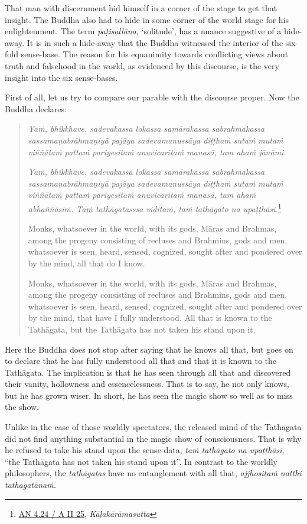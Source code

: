 That man with discernment hid himself in a corner of the stage to get that insight. The Buddha also had to hide in some corner of the world stage for his enlightenment. The term \emph{paṭisallāna}, `solitude', has a nuance suggestive of a hide-away. It is in such a hide-away that the Buddha witnessed the interior of the six-fold sense-base. The reason for his equanimity towards conflicting views about truth and falsehood in the world, as evidenced by this discourse, is the very insight into the six sense-bases.

First of all, let us try to compare our parable with the discourse proper. Now the Buddha declares:

\begin{quote}
\emph{Yaṁ, bhikkhave, sadevakassa lokassa samārakassa sabrahmakassa sassamaṇabrāhmaṇiyā pajāya sadevamanussāya diṭṭhaṁ sutaṁ mutaṁ viññātaṁ pattaṁ pariyesitaṁ anuvicaritaṁ manasā, tam ahaṁ jānāmi.}

\emph{Yaṁ, bhikkhave, sadevakassa lokassa samārakassa sabrahmakassa sassamaṇabrāhmaṇiyā pajāya sadevamanussāya diṭṭhaṁ sutaṁ mutaṁ viññātaṁ pattaṁ pariyesitaṁ anuvicaritaṁ manasā, tam ahaṁ abhaññāsiṁ. Taṁ tathāgatasssa viditaṁ, taṁ tathāgato na upaṭṭhāsi.}\footnote{\href{https://suttacentral.net/an4.24/pli/ms}{AN 4.24 / A II 25}, \emph{Kāḷakārāmasutta}}

Monks, whatsoever in the world, with its gods, Māras and Brahmas, among the progeny consisting of recluses and Brahmins, gods and men, whatsoever is seen, heard, sensed, cognized, sought after and pondered over by the mind, all that do I know.

Monks, whatsoever in the world, with its gods, Māras and Brahmas, among the progeny consisting of recluses and Brahmins, gods and men, whatsoever is seen, heard, sensed, cognized, sought after and pondered over by the mind, that have I fully understood. All that is known to the Tathāgata, but the Tathāgata has not taken his stand upon it.
\end{quote}

Here the Buddha does not stop after saying that he knows all that, but goes on to declare that he has fully understood all that and that it is known to the Tathāgata. The implication is that he has seen through all that and discovered their vanity, hollowness and essencelessness. That is to say, he not only knows, but he has grown wiser. In short, he has seen the magic show so well as to miss the show.

Unlike in the case of those worldly spectators, the released mind of the Tathāgata did not find anything substantial in the magic show of consciousness. That is why he refused to take his stand upon the sense-data, \emph{taṁ tathāgato na upaṭṭhāsi}, ``the Tathāgata has not taken his stand upon it''. In contrast to the worldly philosophers, the \emph{tathāgatas} have no entanglement with all that, \emph{ajjhositaṁ natthi tathāgatānaṁ.}

